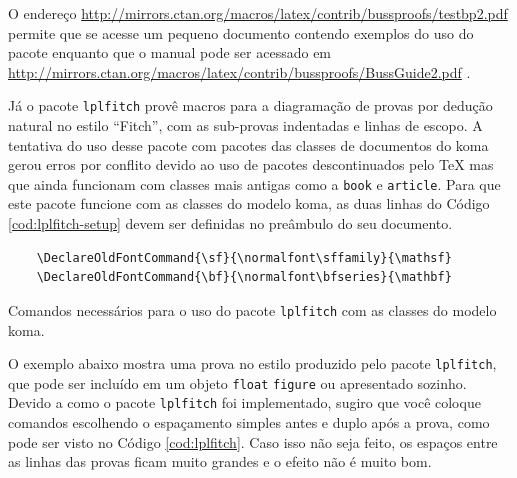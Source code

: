 O endereço \url{http://mirrors.ctan.org/macros/latex/contrib/bussproofs/testbp2.pdf} permite que se acesse um pequeno documento contendo exemplos do uso do pacote enquanto que o manual pode ser acessado em \url{http://mirrors.ctan.org/macros/latex/contrib/bussproofs/BussGuide2.pdf} \parencite{bussproofs}.

Já o pacote \texttt{lplfitch} provê macros para a diagramação de provas por dedução natural no estilo ``Fitch'', com as sub-provas indentadas e linhas de escopo. A tentativa do uso desse pacote com pacotes das classes de documentos do \gls{koma} gerou erros por conflito devido ao uso de pacotes descontinuados pelo \TeX{} mas que ainda funcionam com classes mais antigas como a \texttt{book} e \texttt{article}. Para que este pacote funcione com as classes do modelo \gls{koma}, as duas linhas do Código \ref{cod:lplfitch-setup} devem ser definidas no preâmbulo do seu documento.

\begin{listing}[ht]
	\begin{verbatim}
	\DeclareOldFontCommand{\sf}{\normalfont\sffamily}{\mathsf}
	\DeclareOldFontCommand{\bf}{\normalfont\bfseries}{\mathbf}
	\end{verbatim} 
	\caption{Comandos necessários para o uso do pacote \texttt{lplfitch} \parencite{lplfitch} com as classes do modelo \gls{koma}.}
	\label{cod:lplfitch-setup}
\end{listing}

O exemplo abaixo mostra uma prova no estilo produzido pelo pacote \texttt{lplfitch}, que pode ser incluído em um objeto \texttt{float} \texttt{figure} ou apresentado sozinho. Devido a como o pacote \texttt{lplfitch} foi implementado, sugiro que você coloque comandos escolhendo o espaçamento simples antes e duplo após a prova, como pode ser visto no Código \ref{cod:lplfitch}. Caso isso não seja feito, os espaços entre as linhas das provas ficam muito grandes e o efeito não é muito bom.

\singlespacing
{}
\doublespacing

